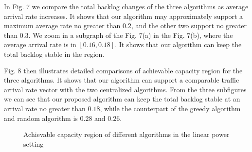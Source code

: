 \documentclass[journal]{IEEEtran}
\begin{document}
In Fig. 7 we compare the total backlog changes of the three algorithms as average arrival rate increases. It shows that our algorithm may approximately support a maximum average rate no greater than $0.2$, and the other two support  no greater than $0.3$. We zoom in a subgraph of the Fig. 7(a) in the Fig. 7(b), where the average arrival rate is in $[0.16, 0.18]$. It shows that our algorithm can keep the total backlog stable in the region.
\begin{comment}
We then carefully compare the total backlog fluctuation from time slot $0 $ to time slot $10000$ at average arrival rate $0.20,\mbox{ } 0.27,\mbox{ } 0.32$, where the DS, RA, GMS is respectively under an unstable point, as illustrated in Fig. 7.
\end{comment}
Fig. 8 then illustrates detailed comparisons of achievable capacity region for the three algorithms. It shows that our algorithm can support a comparable traffic arrival rate vector with the two centralized algorithms.  From the three subfigures we can see that our proposed algorithm can keep the total backlog stable at an arrival rate no greater than $0.18$, while the counterpart of the greedy algorithm and random algorithm is $0.28$ and $0.26$.

\begin{comment}
\begin{figure*}
\centering
    \subfigure[Average arrival rate = $0.20$ ]{
        \texttt{[image: lp-rate20.eps]}}
  \hspace{0cm}
\subfigure[Average arrival rate = $0.27$]{
        \texttt{[image: lp-rate27.eps]}}
  \hspace{0cm}
\subfigure[Average arrival rate =$ 0.32$]{
        \texttt{[image: lp-rate32.eps]}}
   \caption{{\small{Total backlog vs. time slot vs. different algorithms at different average arrival rate in the linear power setting }}}
   \vspace*{-1\baselineskip}
\end{figure*}
\end{comment}

\begin{figure*}
    \centering
  \hspace{0cm}
  \hspace{0cm}
   \caption{{\small{Achievable capacity region of different algorithms in the linear power setting}}}
\end{figure*}
\end{document}
